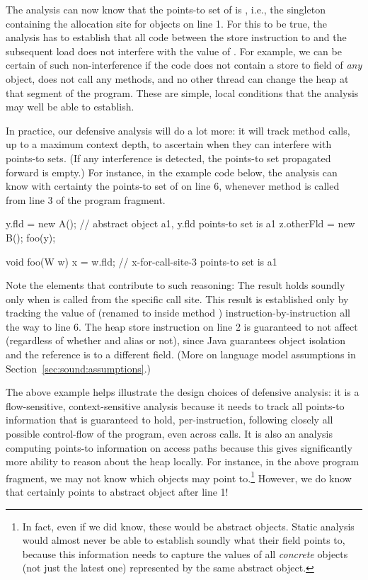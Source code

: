The analysis can now know that the points-to set of  is , i.e., the singleton containing the allocation site for  objects on line 1. For this to be true, the analysis has to establish that all code between the store instruction to  and the subsequent load does not interfere with the value of . For example, we can be certain of such non-interference if the code does not contain a store to field  of \emph{any} object, does not call any methods, and no other thread can change the heap at that segment of the program. These are simple, local conditions that the analysis may well be able to establish.

In practice, our defensive analysis will do a lot more: it will track method calls, up to a maximum context depth, to ascertain when they can interfere with points-to sets. (If any interference is detected, the points-to set propagated forward is empty.) For instance, in the example code below, the analysis can know with certainty the points-to set of  on line 6, whenever method  is called from line 3 of the program fragment.

\begin{javaBoxLn}
y.fld = new A(); // abstract object a1, y.fld points-to set is {a1}
z.otherFld = new B();
foo(y);

void foo(W w) {
    x = w.fld;   // x-for-call-site-3 points-to set is {a1}
}
\end{javaBoxLn}

Note the elements that contribute to such reasoning: The result holds soundly only when  is called from the specific call site. This result is established only by tracking the value of  (renamed to  inside method ) instruction-by-instruction all the way to line 6. The heap store instruction on line 2 is guaranteed to not affect  (regardless of whether  and  alias or not), since Java guarantees object isolation and the reference is to a different field. (More on language model assumptions in Section~\ref{sec:sound:assumptions}.)

The above example helps illustrate the design choices of defensive analysis: it is a flow-sensitive, context-sensitive analysis because it needs to track all points-to information that is guaranteed to hold, per-instruction, following closely all possible control-flow of the program, even across calls. It is also an analysis computing points-to information on access paths because this gives significantly more ability to reason about the heap locally. For instance, in the above program fragment, we may not know which objects  may point to.\footnote{In fact, even if we did know, these would be abstract objects. Static analysis would almost never be able to establish soundly what their  field points to, because this information needs to capture the  values of all \emph{concrete} objects (not just the latest one) represented by the same abstract object.} However, we do know that  certainly points to abstract object  after line 1!


